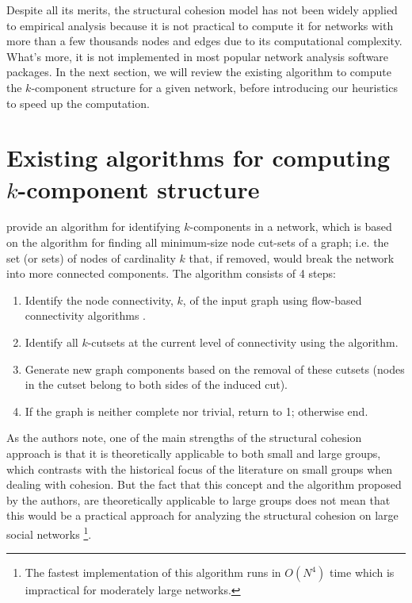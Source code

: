 Despite all its merits, the structural cohesion model has not been widely applied to empirical analysis because it is not practical to compute it for networks with more than a few thousands nodes and edges due to its computational complexity. What's more, it is not implemented in most popular network analysis software packages. In the next section, we will review the existing algorithm to compute the $k$-component structure for a given network, before introducing our heuristics to speed up the computation.

\section{Existing algorithms for computing $k$-component structure}

\citet[appendix A]{moody:2003} provide an algorithm for identifying $k$-components in a network, which is based on the \citet{kanevsky:1993} algorithm for finding all minimum-size node cut-sets of a graph; i.e. the set (or sets) of nodes of cardinality $k$ that, if removed, would break the network into more connected components. The algorithm consists of 4 steps:

\begin{enumerate}

\item Identify the node connectivity, $k$, of the input graph using flow-based connectivity algorithms \citep[chapter 7]{brandes:2005}.

\item Identify all $k$-cutsets at the current level of connectivity using the \citet{kanevsky:1993} algorithm.

\item Generate new graph components based on the removal of these cutsets (nodes in the cutset belong to both sides of the induced cut).

\item If the graph is neither complete nor trivial, return to 1; otherwise end.

\end{enumerate}

As the authors note, one of the main strengths of the structural cohesion approach is that it is theoretically applicable to both small and large groups, which contrasts with the historical focus of the literature on small groups when dealing with cohesion. But the fact that this concept and the algorithm proposed by the authors, are theoretically applicable to large groups does not mean that this would be a practical approach for analyzing the structural cohesion on large social networks \footnote{The fastest implementation of this algorithm runs in $O(N^4)$ time \citep{igraph} which is impractical for moderately large networks.}.

